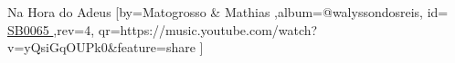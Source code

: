 \beginsong
{Na Hora do Adeus %
}[by={Matogrosso \& Mathias %
},album={@walyssondosreis},
id={\href{https://music.youtube.com/watch?v=yQsiGqOUPk0&feature=share %
}{ SB0065 %
}},rev={4}, %
qr={https://music.youtube.com/watch?v=yQsiGqOUPk0&feature=share %
}]
\beginverse 
